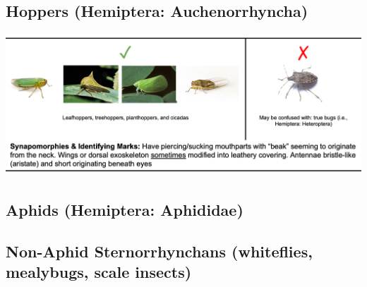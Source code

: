 \documentclass[
  letterpaper,
  oneside,
  open=any]{scrbook}
\begin{document}
\subsection{Hoppers (Hemiptera:
Auchenorrhyncha)}\label{hoppers-hemiptera-auchenorrhyncha}

\includegraphics{protocols/images/img25.png}

\subsection{Aphids (Hemiptera:
Aphididae)}\label{aphids-hemiptera-aphididae}

\begin{figure}


\caption{\label{fig-herbvivores4}}

\end{figure}%

\subsection{Non-Aphid Sternorrhynchans (whiteflies, mealybugs, scale
insects)}\label{non-aphid-sternorrhynchans-whiteflies-mealybugs-scale-insects}
\end{document}
